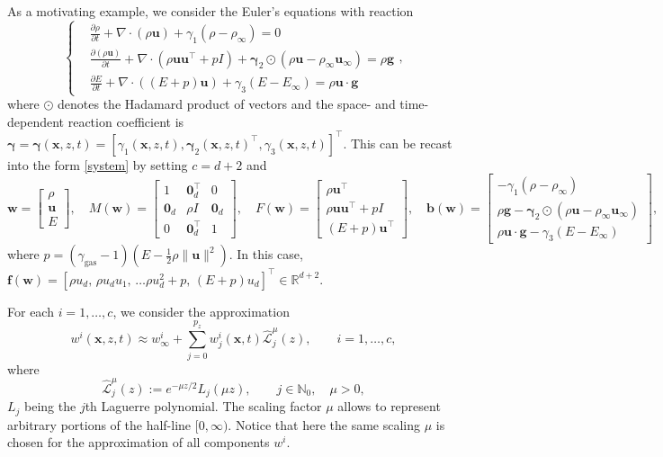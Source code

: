 \documentclass{article}
\newcommand{\Rbb}{\mathbb{R}}
\newcommand{\ubf}{\mathbf{u}}
\newcommand{\gbf}{\mathbf{g}}
\newcommand{\wbf}{\mathbf{w}}
\newcommand{\bbf}{\mathbf{b}}
\newcommand{\xbf}{\mathbf{x}}
\newcommand{\fbf}{\mathbf{f}}
\newcommand{\gambf}{\boldsymbol{\gamma}}
\newcommand{\zebf}{\mathbf{0}}
\newcommand{\cLh}{\hat{\mathscr{L}}}
\providecommand{\norm}[1]{\lVert#1\rVert}
\begin{document}
	As a motivating example, we consider the Euler's equations with reaction
	\begin{equation*}
		\begin{cases}
			&\displaystyle\frac{\partial\rho}{\partial t} + \nabla\cdot(\rho\ubf) +\gamma_1(\rho-\rho_\infty) = 0 \\
			&\displaystyle\frac{\partial(\rho\ubf)}{\partial t} + \nabla\cdot(\rho\ubf\ubf^\top+pI)+\boldsymbol{\gamma}_2\odot(\rho\ubf-\rho_\infty\ubf_\infty)=\rho\gbf \\
			&\displaystyle\frac{\partial E}{\partial t}+\nabla\cdot((E+p)\ubf)+\gamma_3(E-E_\infty)=\rho\ubf\cdot\gbf
		\end{cases},
	\end{equation*}
	where $\odot$ denotes the Hadamard product of vectors and the space- and time-dependent reaction coefficient is $\gambf=\gambf(\xbf,z,t)=[\gamma_1(\xbf,z,t),\gambf_2(\xbf,z,t)^\top,\gamma_3(\xbf,z,t)]^\top$. This can be recast into the form \eqref{system} by setting $c=d+2$ and
	\begin{equation*}
		\wbf=\begin{bmatrix}
			\rho \\ \ubf \\ E
		\end{bmatrix}, \quad M(\wbf)=\begin{bmatrix}
			1 & \zebf_d^\top & 0 \\
			\zebf_d & \rho I & \zebf_d \\
			0 & \zebf_d^\top & 1
		\end{bmatrix}, \quad F(\wbf)=\begin{bmatrix}
			\rho\ubf^\top \\ \rho\ubf\ubf^\top+pI \\ (E+p)\ubf^\top
		\end{bmatrix} ,\quad \bbf(\wbf) = \begin{bmatrix}
			-\gamma_1(\rho-\rho_\infty) \\ \rho\gbf-\boldsymbol{\gamma}_2\odot(\rho\ubf-\rho_\infty\ubf_\infty) \\ \rho\ubf\cdot\gbf - \gamma_3(E-E_\infty)
		\end{bmatrix},
	\end{equation*}
	where $p=(\gamma_{\mathrm{gas}}-1)\left(E-\frac12\rho \norm{\ubf}^2\right)$.
	In this case, $\fbf(\wbf)=[\rho u_d, \,\rho u_du_1,\, \dots \rho u_d^2 + p,\, (E+p)u_d]^\top\in\Rbb^{d+2}$.
	
	For each $i=1,\dots,c$, we consider the approximation
	\begin{equation}\label{approx_general}
		w^i(\xbf,z,t) \approx w^i_\infty +\sum_{j=0}^{p_z}w_j^i(\xbf,t)\cLh_j^\mu(z), \qquad i=1,\dots,c,
	\end{equation}
	where
	\begin{equation*}
		\cLh_j^\mu(z) := e^{-\mu z/2}L_j(\mu z), \qquad j\in\mathbb{N}_0, \quad \mu>0,
	\end{equation*}
	$L_j$ being the $j$th Laguerre polynomial. The scaling factor $\mu$ allows to represent arbitrary portions of the half-line $[0,\infty)$. Notice that here the same scaling $\mu$ is chosen for the approximation of all components $w^i$. 
	
\end{document}
